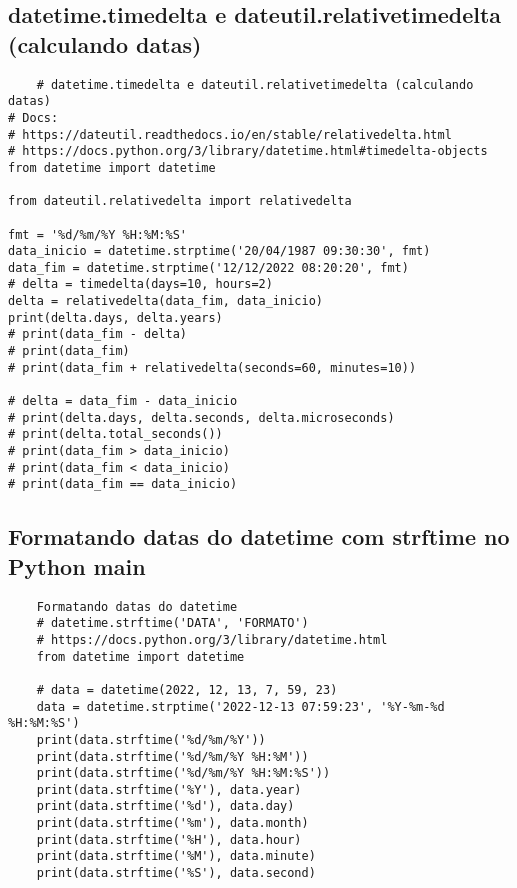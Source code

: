 \documentclass{article}
\begin{document}
\subsection{datetime.timedelta e dateutil.relativetimedelta (calculando datas)}
\begin{lstlisting}
    # datetime.timedelta e dateutil.relativetimedelta (calculando datas)
# Docs:
# https://dateutil.readthedocs.io/en/stable/relativedelta.html
# https://docs.python.org/3/library/datetime.html#timedelta-objects
from datetime import datetime

from dateutil.relativedelta import relativedelta

fmt = '%d/%m/%Y %H:%M:%S'
data_inicio = datetime.strptime('20/04/1987 09:30:30', fmt)
data_fim = datetime.strptime('12/12/2022 08:20:20', fmt)
# delta = timedelta(days=10, hours=2)
delta = relativedelta(data_fim, data_inicio)
print(delta.days, delta.years)
# print(data_fim - delta)
# print(data_fim)
# print(data_fim + relativedelta(seconds=60, minutes=10))

# delta = data_fim - data_inicio
# print(delta.days, delta.seconds, delta.microseconds)
# print(delta.total_seconds())
# print(data_fim > data_inicio)
# print(data_fim < data_inicio)
# print(data_fim == data_inicio)

\end{lstlisting}

\subsection{Formatando datas do datetime com strftime no Python
main}
\begin{lstlisting}
    Formatando datas do datetime
    # datetime.strftime('DATA', 'FORMATO')
    # https://docs.python.org/3/library/datetime.html
    from datetime import datetime
    
    # data = datetime(2022, 12, 13, 7, 59, 23)
    data = datetime.strptime('2022-12-13 07:59:23', '%Y-%m-%d %H:%M:%S')
    print(data.strftime('%d/%m/%Y'))
    print(data.strftime('%d/%m/%Y %H:%M'))
    print(data.strftime('%d/%m/%Y %H:%M:%S'))
    print(data.strftime('%Y'), data.year)
    print(data.strftime('%d'), data.day)
    print(data.strftime('%m'), data.month)
    print(data.strftime('%H'), data.hour)
    print(data.strftime('%M'), data.minute)
    print(data.strftime('%S'), data.second)

\end{lstlisting}
\end{document}
